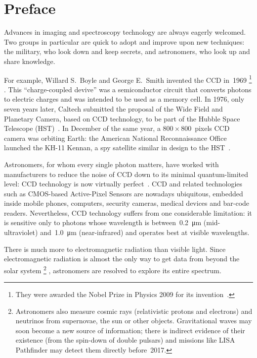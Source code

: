 \cleardoublepage
\chapter{Preface}
\label{sec:preface}

Advances in imaging and spectroscopy technology are always eagerly welcomed.
Two groups in particular are quick to adopt and improve upon new techniques: the military, who look down and keep secrets, and astronomers, who look up and share knowledge.

For example, Willard S.\ Boyle and George E.\ Smith invented the CCD in~1969%
\footnote{
   They were awarded the Nobel Prize in Physics 2009 for its invention~\parencite{nobel2009}.
}%
.
This ``charge-coupled devive'' was a semiconductor circuit that converts photons to electric charges and was intended to be used as a memory cell.
In 1976, only seven years later,
Caltech submitted the proposal of the Wide Field and Planetary Camera,
based on CCD technology,
to be part of the Hubble Space Telescope (HST)~\parencite{leckrone1980space}.
In December of the same year, a $800\times800$~pixels CCD camera was orbiting Earth: the American National Reconnaissance Office launched the KH-11 Kennan, a spy satellite similar in design to the HST~\parencite[see references in][]{wiki:kh11kennan}.

Astronomers, for whom every single photon matters, have worked with manufacturers to reduce the noise of CCD down to its minimal quantum-limited level: CCD technology is now virtually perfect~\parencite{mackay2010}.
CCD and related technologies such as CMOS-based Active-Pixel Sensors are nowadays ubiquitous, embedded inside mobile phones, computers, security cameras, medical devices and bar-code readers.
Nevertheless, CCD technology suffers from one considerable limitation: it is sensitive only to photons whose wavelength is between~\SI{0.2}{\micro\meter} (mid-ultraviolet) and~\SI{1.0}{\micro\meter} (near-infrared) and operates best at visible wavelengths.

There is much more to electromagnetic radiation than visible light.
Since electromagnetic radiation is almost the only way to get data from beyond the solar system%
\footnote{
    Astronomers also measure cosmic rays (relativistic protons and electrons) and neutrinos from supernovae, the sun or other objects.
    Gravitational waves may soon become a new source of information;
    there is indirect evidence of their existence (from the spin-down of double pulsars) and missions like LISA Pathfinder may detect them directly before~2017.
}%
, astronomers are resolved to explore its entire spectrum.

